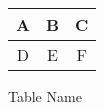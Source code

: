 \documentclass[12pt, a4paper]{report}
\begin{document}
\begin{figure}
\centering
\caption{Table Name}
\begin{tabular}{|c|c|c|}
\hline
A & B & C \\
\hline
D & E & F \\
\hline
\end{tabular}
\end{figure}
\end{document}
